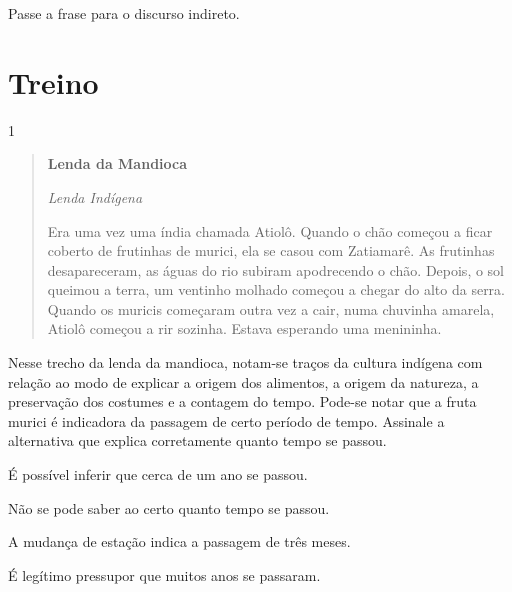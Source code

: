 Passe a frase para o discurso indireto.


\section{Treino}

\num{1}

\begin{quote}

\textbf{Lenda da Mandioca}

\emph{Lenda Indígena}

Era uma vez uma índia chamada Atiolô. Quando o chão começou a ficar
coberto de frutinhas de murici, ela se casou com Zatiamarê. As frutinhas
desapareceram, as águas do rio subiram apodrecendo o chão. Depois, o sol
queimou a terra, um ventinho molhado começou a chegar do alto da serra.
Quando os muricis começaram outra vez a cair, numa chuvinha amarela,
Atiolô começou a rir sozinha. Estava esperando uma menininha.

\end{quote}


Nesse trecho da lenda da mandioca, notam-se traços da cultura
indígena com relação ao modo de explicar a origem dos alimentos, a
origem da natureza, a preservação dos costumes e a contagem do tempo.
Pode-se notar que a fruta murici é indicadora da passagem de certo 
período de tempo. Assinale a alternativa que explica corretamente 
quanto tempo se passou.

\begin{escolha}

  \item É possível inferir que cerca de um ano se passou.
  
  \item Não se pode saber ao certo quanto tempo se passou.
  
  \item A mudança de estação indica a passagem de três meses.  
  
  \item É legítimo pressupor que muitos anos se passaram. 

\end{escolha}


